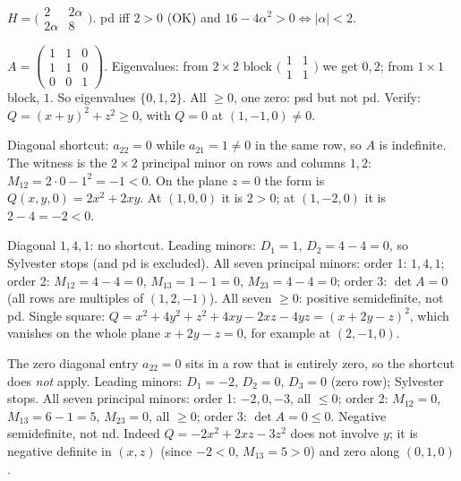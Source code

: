 \begin{solutions}
    \item $H = \bigl(\begin{smallmatrix} 2 & 2 \alpha \\ 2 \alpha & 8 \end{smallmatrix}\bigr)$. pd iff $2 > 0$ (OK) and $16 - 4 \alpha^{2} > 0 \Leftrightarrow |\alpha| < 2$.
    \item $A = \begin{pmatrix} 1 & 1 & 0 \\ 1 & 1 & 0 \\ 0 & 0 & 1 \end{pmatrix}$. Eigenvalues: from $2 \times 2$ block $\bigl(\begin{smallmatrix} 1 & 1 \\ 1 & 1 \end{smallmatrix}\bigr)$ we get $0, 2$; from $1 \times 1$ block, $1$. So eigenvalues $\{0, 1, 2\}$. All $\ge 0$, one zero: psd but not pd. Verify: $Q = (x + y)^{2} + z^{2} \ge 0$, with $Q = 0$ at $(1, -1, 0) \neq 0$.
    \item Diagonal shortcut: $a_{22} = 0$ while $a_{21} = 1 \neq 0$ in the same row, so $A$ is indefinite. The witness is the $2 \times 2$ principal minor on rows and columns $1, 2$: $M_{12} = 2 \cdot 0 - 1^{2} = -1 < 0$.
          On the plane $z = 0$ the form is $Q(x, y, 0) = 2 x^{2} + 2 x y$. At $(1, 0, 0)$ it is $2 > 0$; at $(1, -2, 0)$ it is $2 - 4 = -2 < 0$.
    \item Diagonal $1, 4, 1$: no shortcut. Leading minors: $D_{1} = 1$, $D_{2} = 4 - 4 = 0$, so Sylvester stops (and pd is excluded). All seven principal minors: order 1: $1, 4, 1$; order 2: $M_{12} = 4 - 4 = 0$, $M_{13} = 1 - 1 = 0$, $M_{23} = 4 - 4 = 0$; order 3: $\det A = 0$ (all rows are multiples of $(1, 2, -1)$). All seven $\ge 0$: positive semidefinite, not pd.
          Single square: $Q = x^{2} + 4 y^{2} + z^{2} + 4 x y - 2 x z - 4 y z = (x + 2 y - z)^{2}$, which vanishes on the whole plane $x + 2y - z = 0$, for example at $(2, -1, 0)$.
    \item The zero diagonal entry $a_{22} = 0$ sits in a row that is entirely zero, so the shortcut does \emph{not} apply. Leading minors: $D_{1} = -2$, $D_{2} = 0$, $D_{3} = 0$ (zero row); Sylvester stops. All seven principal minors: order 1: $-2, 0, -3$, all $\le 0$; order 2: $M_{12} = 0$, $M_{13} = 6 - 1 = 5$, $M_{23} = 0$, all $\ge 0$; order 3: $\det A = 0 \le 0$. Negative semidefinite, not nd.
          Indeed $Q = -2 x^{2} + 2 x z - 3 z^{2}$ does not involve $y$; it is negative definite in $(x, z)$ (since $-2 < 0$, $M_{13} = 5 > 0$) and zero along $(0, 1, 0)$.

\end{solutions}
